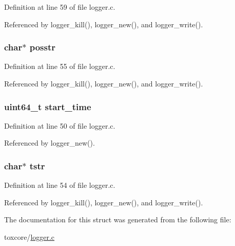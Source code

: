 Definition at line 59 of file logger.\+c.



Referenced by logger\+\_\+kill(), logger\+\_\+new(), and logger\+\_\+write().

\hypertarget{structlogger_a56126aabcbc86b3b9b826e08036685eb}{
\subsubsection[{posstr}]{\setlength{\rightskip}{0pt plus 5cm}char$\ast$ posstr}}\label{structlogger_a56126aabcbc86b3b9b826e08036685eb}


Definition at line 55 of file logger.\+c.



Referenced by logger\+\_\+kill(), logger\+\_\+new(), and logger\+\_\+write().

\hypertarget{structlogger_a5b11efea935978e9f1913e964a5e5396}{
\subsubsection[{start\+\_\+time}]{\setlength{\rightskip}{0pt plus 5cm}uint64\+\_\+t start\+\_\+time}}\label{structlogger_a5b11efea935978e9f1913e964a5e5396}


Definition at line 50 of file logger.\+c.



Referenced by logger\+\_\+new().

\hypertarget{structlogger_a756188d61db4922010ba1bf67c2f381e}{
\subsubsection[{tstr}]{\setlength{\rightskip}{0pt plus 5cm}char$\ast$ tstr}}\label{structlogger_a756188d61db4922010ba1bf67c2f381e}


Definition at line 54 of file logger.\+c.



Referenced by logger\+\_\+kill(), logger\+\_\+new(), and logger\+\_\+write().



The documentation for this struct was generated from the following file\+:\begin{DoxyCompactItemize}
\item 
toxcore/\hyperlink{logger_8c}{logger.\+c}\end{DoxyCompactItemize}
